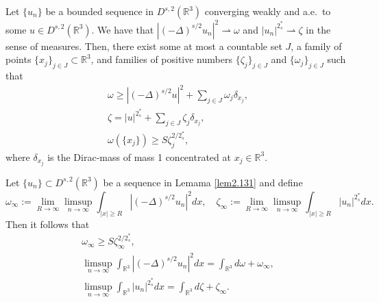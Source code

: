 \begin{lemma}[\cite{Z1688}] \label{lem2.131}
Let $\{u_n\}$ be a bounded sequence in $D^{s,2}(\mathbb{R}^3)$ converging weakly
and a.e.\ to some $u\in D^{s,2}(\mathbb{R}^3)$.
 We have that $|(-\Delta)^{s/2}u_n|^2\rightharpoonup \omega$ and
 $|u_n|^{2^*_s}\rightharpoonup \zeta$ in the sense of measures.
Then, there exist some at most a countable set $J$, a family of points
$\{x_j\}_{j\in J} \subset \mathbb{R}^3$, and families of positive numbers
$\{\zeta_j\}_{j\in J}$ and $\{\omega_j\}_{j\in J}$ such that
\begin{gather}\label{lab3.11}
\omega \geq |(-\Delta)^{s/2}u|^2+\sum_{j\in J}\omega_j\delta_{x_j}, \\
\label{lab3.12}
\zeta=|u|^{2^*_s}+\sum_{j\in J}\zeta_j\delta_{x_j}, \\
\label{lab3.13}
\omega(\{x_j\})\geq S\zeta^{2/2^*_s}_j,
\end{gather}
where $\delta_{x_j}$ is the Dirac-mass of mass 1 concentrated at
$x_j\in {\mathbb{R}^3}$.
\end{lemma}


\begin{lemma}[\cite{Z1688}] \label{lem2.11}
Let $\{u_n\}\subset D^{s,2}(\mathbb{R}^3)$ be a sequence in Lemama \ref{lem2.131}
and define
\[
\omega_\infty:={\lim_{R\to \infty}}\limsup_{n\to\infty}
\int_{|x|\geq R} |(-\Delta)^{s/2}u_n|^2dx , \quad
\zeta_\infty:={\lim_{R\to \infty}}\limsup_{n\to\infty}
\int_{|x|\geq R} |u_n|^{2^*_s}dx.
\]
Then it follows that
\begin{gather*}%
\omega_\infty \geq S\zeta^{2/2^*_s}_\infty, \\
\limsup_{n\to\infty} \int_{\mathbb{R}^3}|(-\Delta)^{s/2}u_n|^2dx
=\int_{\mathbb{R}^3}d\omega +\omega_\infty,\\
\limsup_{n\to\infty} \int_{\mathbb{R}^3}|u_n|^{2^*_s}dx=\int_{\mathbb{R}^3}d\zeta +\zeta_\infty.\\
\end{gather*}
\end{lemma}

